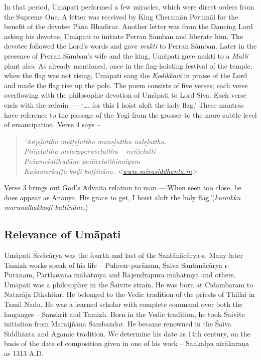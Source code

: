 In that period, Umāpati performed a few miracles, which were direct orders from the Supreme One. A letter was received by King Cheramān Perumāl for the benefit of the devotee Pāna Bhadirar. Another letter was from the Dancing Lord asking his devotee, Umāpati to initiate Perran Sāmban and liberate him. The devotee followed the Lord’s words and gave \textit{mukti }to Perran Sāmban. Later in the presence of Perran Sāmban’s wife and the king, Umāpati gave mukti to a \textit{Malli} plant also. As already mentioned, once in the flag-hoisting festival of the temple, when the flag was not rising, Umāpati sang the \textit{Kodikkavi} in praise of the Lord and made the flag rise up the pole. The poem consists of five verses; each verse overflowing with the philosophic devotion of Umāpati to Lord Siva. Each verse ends with the refrain -----‘…. for this I hoist aloft the holy flag.’ These mantras have reference to the passage of the Yogi from the grosser to the more subtle level of emancipation. Verse 4 says –

\begin{quote}
\textit{‘Añjeḻutthu meṭṭeḻutthu māneḻutthu nāleḻutthu. }\\\textit{Piñjeḻutthu melaipperuveḻutthu – neñjeḻutti}\\\textit{Peśumeḻutthudāne peśāveḻutthinaiyum}\\\textit{Kuśamarkaṭṭa koḍi kaṭṭināne. \textless \url{www.saivasiddhanta.in}\textgreater  }
\end{quote}

Verse 3 brings out God’s Advaita relation to man.—‘When seen too close, he does appear as Ananya. His grace to get, I hoist aloft the holy flag.’(\textit{kuraikku marunalhakkoḍi kattināne}.)


\subsection*{Relevance of Umāpati}

Umāpati Śivācārya was the fourth and last of the Santānācārya-s. Many later Tamizh works speak of his life – Pulavar-purānam, Śaiva Santanācārya r-Purānam, Pārthavana māhātmya and Rajendrapura māhātmya and others. Umāpati was a philosopher in the Śaivite strain. He was born at Cidambaram to Natarāja Dikshitar. He belonged to the Vedic tradition of the priests of Thillai in Tamil Nadu. He was a learned scholar with complete command over both the languages – Sanskrit and Tamizh. Born in the Vedic tradition, he took Śaivite initiation from Maraijñāna Sambandar. He became renowned in the Śaiva Siddhānta and Agamic tradition. We determine his date as 14th century, on the basis of the date of composition given in one of his work – Saṅkalpa nirākaraṇa as 1313 A.D.

